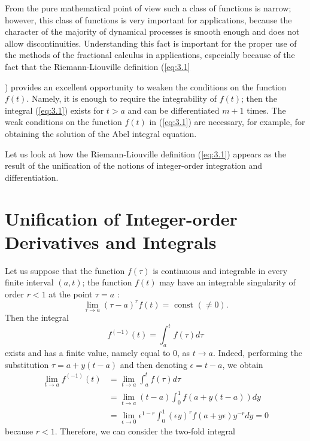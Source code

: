 \documentclass[a4paper,14pt,oneside]{book}
\theoremstyle{plain}
\theoremstyle{definition}
\theoremstyle{remark}
\begin{document}
\begin{center}
\begin{flushleft}
{\par From the pure mathematical point of view such a class of functions is narrow; however, this class of functions is very important for applications, because the character of the majority of dynamical processes is smooth enough and does not allow discontinuities. Understanding this fact is important for the proper use of the methods of the fractional calculus in applications, especially because of the fact that the Riemann-Liouville definition (\ref{eq:3.1}}) provides an excellent opportunity to weaken the conditions on the function $f(t)$. Namely, it is enough to require the integrability of $f(t)$; then the integral (\ref{eq:3.1}) exists for $t>a$ and can be differentiated $m+1$ times. The weak conditions on the function $f(t)$ in (\ref{eq:3.1}) are necessary, for example, for obtaining the solution of the Abel integral equation.
\par Let us look at how the Riemann-Liouville definition (\ref{eq:3.1}) appears as the result of the unification of the notions of integer-order integration and differentiation.

\section{Unification of Integer-order Derivatives and Integrals}
Let us suppose that the function $f(\tau)$ is continuous and integrable in every finite interval $(a, t)$; the function $f(t)$ may have an integrable singularity of order $r<1$ at the point $\tau=a$ :
$$
\lim _{\tau \rightarrow a}(\tau-a)^{r} f(t)=\text { const }(\neq 0) .
$$
Then the integral
\begin{equation}\label{eq:3.3}
f^{(-1)}(t)=\int_{a}^{t} f(\tau) d \tau
\end{equation}
exists and has a finite value, namely equal to 0, as $t \rightarrow a$. Indeed, performing the substitution $\tau=a+y(t-a)$ and then denoting $\epsilon=t-a$,
we obtain
\begin{align}
\lim _{t \rightarrow a} f^{(-1)}(t) &=\lim _{t \rightarrow a} \int_{a}^{t} f(\tau) d \tau\nonumber\\
&=\lim _{t \rightarrow a}(t-a) \int_{0}^{1} f(a+y(t-a))dy\nonumber\\
&=\lim _{\epsilon \rightarrow 0} \epsilon^{1-r} \int_{0}^{1}(\epsilon y)^{r} f(a+y \epsilon) y^{-r} d y=0
\end{align}
because $r<1$. Therefore, we can consider the two-fold integral


\end{flushleft}
\end{center}
\end{document}
